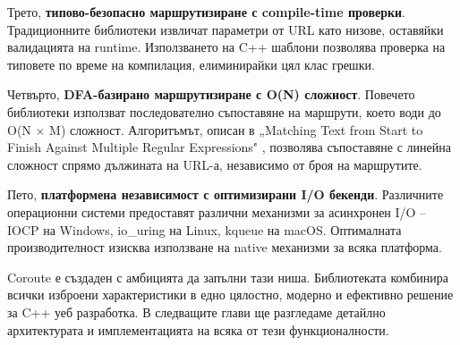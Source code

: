 Трето, \textbf{типово-безопасно маршрутизиране с compile-time проверки}. Традиционните библиотеки извличат параметри от URL като низове, оставяйки валидацията на runtime. Използването на C++ шаблони позволява проверка на типовете по време на компилация, елиминирайки цял клас грешки.

Четвърто, \textbf{DFA-базирано маршрутизиране с O(N) сложност}. Повечето библиотеки използват последователно съпоставяне на маршрути, което води до O(N × M) сложност. Алгоритъмът, описан в „Matching Text from Start to Finish Against Multiple Regular Expressions" \cite{stankov2024regex}, позволява съпоставяне с линейна сложност спрямо дължината на URL-а, независимо от броя на маршрутите.

Пето, \textbf{платформена независимост с оптимизирани I/O бекенди}. Различните операционни системи предоставят различни механизми за асинхронен I/O -- IOCP на Windows, io\_uring на Linux, kqueue на macOS. Оптималната производителност изисква използване на native механизми за всяка платформа.

Coroute е създаден с амбицията да запълни тази ниша. Библиотеката комбинира всички изброени характеристики в едно цялостно, модерно и ефективно решение за C++ уеб разработка. В следващите глави ще разгледаме детайлно архитектурата и имплементацията на всяка от тези функционалности.

